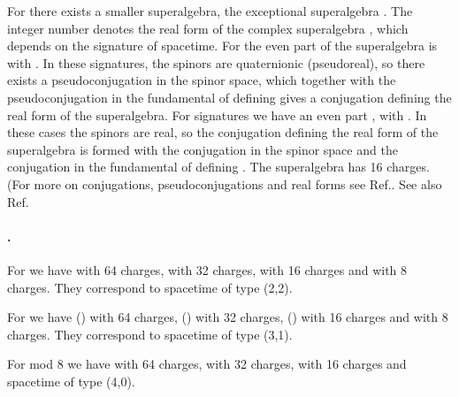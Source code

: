 \documentclass[a4paper,12pt]{article}
\begin{document}
For \coordHE{} there exists a smaller superalgebra, the exceptional
superalgebra \coordHE{}. The integer number \coordHE{} denotes the real
form of the complex superalgebra \coordHE{}, which depends on the
signature of spacetime.  For \coordHE{} the even part of the
superalgebra is \coordHE{} with \coordHE{}. In
these signatures, the spinors are quaternionic (pseudoreal), so
there exists a pseudoconjugation in the spinor space, which
together with the pseudoconjugation in the fundamental of
\coordHE{} defining \coordHE{} gives a conjugation defining the
real form of the superalgebra. For signatures \coordHE{} we have
an even part \coordHE{}, with \coordHE{}. In
these cases the spinors are real, so the conjugation defining the
real form of the superalgebra is formed with the conjugation in
the spinor space and the conjugation in the fundamental of
\coordHE{} defining \coordHE{}.  The superalgebra has 16
charges. (For more on conjugations, pseudoconjugations and real
forms see Ref.\cite{dflv}. See also Ref.\cite{vp}

\paragraph{\coordHE{}.}For \coordHE{} we have \coordHE{} with 64
charges, \coordHE{} with 32 charges, \coordHE{} with 16
charges and \coordHE{} with 8 charges. They correspond to
spacetime of type (2,2).

\smallskip

\noindent For \coordHE{}  we have \coordHE{} (\coordHE{})
with 64 charges, \coordHE{} (\coordHE{}) with 32 charges,
\coordHE{} (\coordHE{}) with 16 charges and \coordHE{} with
8 charges. They correspond to
 spacetime of type (3,1).

\smallskip

\noindent For \coordHE{} mod 8 we have \coordHE{} with 64
charges, \coordHE{} with 32 charges, \coordHE{} with 16
charges
 and spacetime of type (4,0).
\end{document}
